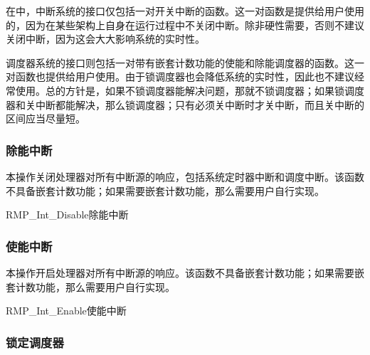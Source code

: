 在中，中断系统的接口仅包括一对开关中断的函数。这一对函数是提供给用户使用的，因为在某些架构上自身在运行过程中不关闭中断。除非硬性需要，否则不建议关闭中断，因为这会大大影响系统的实时性。

调度器系统的接口则包括一对带有嵌套计数功能的使能和除能调度器的函数。这一对函数也提供给用户使用。由于锁调度器也会降低系统的实时性，因此也不建议经常使用。总的方针是，如果不锁调度器能解决问题，那就不锁调度器；如果锁调度器和关中断都能解决，那么锁调度器；只有必须关中断时才关中断，而且关中断的区间应当尽量短。

\subsubsection{除能中断}\label{subsubsec:disable-interrupts}

本操作关闭处理器对所有中断源的响应，包括系统定时器中断和调度中断。该函数不具备嵌套计数功能；如果需要嵌套计数功能，那么需要用户自行实现。

\begin{apidesc}{RMP\_Int\_Disable}{除能中断}
    \begin{apiparams}
    \end{apiparams}
    \begin{apiret}
    \end{apiret}
\end{apidesc}

\subsubsection{使能中断}\label{subsubsec:enable-interrupts}

本操作开启处理器对所有中断源的响应。该函数不具备嵌套计数功能；如果需要嵌套计数功能，那么需要用户自行实现。

\begin{apidesc}{RMP\_Int\_Enable}{使能中断}
    \begin{apiparams}
    \end{apiparams}
    \begin{apiret}
    \end{apiret}
\end{apidesc}

\subsubsection{锁定调度器}\label{subsubsec:lock-the-scheduler}

